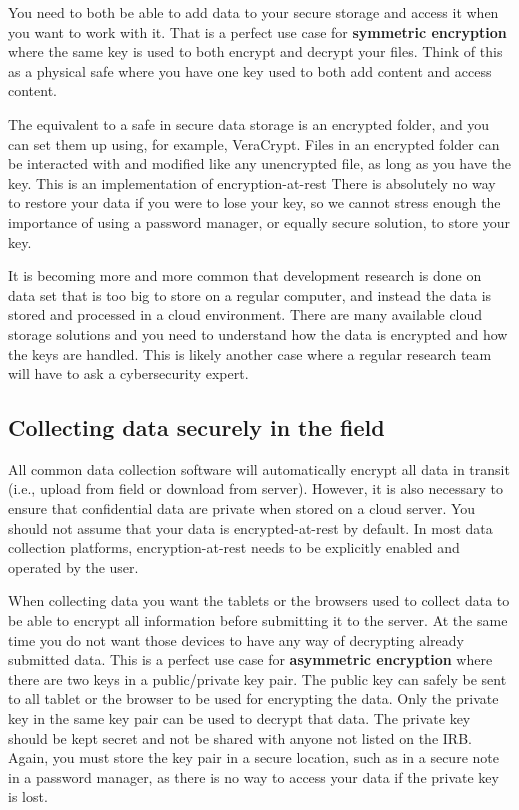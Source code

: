 You need to both be able to add data to your secure storage
and access it when you want to work with it.
That is a perfect use case for \textbf{symmetric encryption} 
where the same key is used to both encrypt and decrypt your files.
Think of this as a physical safe where you have one key 
used to both add content and access content.

The equivalent to a safe in secure data storage is an encrypted folder,
and you can set them up using, for example, VeraCrypt.
Files in an encrypted folder can be interacted with and modified like any unencrypted file,
as long as you have the key.
This is an implementation of encryption-at-rest
There is absolutely no way to restore your data if you were to lose your key, 
so we cannot stress enough the importance of using a password manager,
or equally secure solution, to store your key.

It is becoming more and more common that development research
is done on data set that is too big to store on a regular computer,
and instead the data is stored and processed in a cloud environment. 
There are many available cloud storage solutions
and you need to understand how the data is encrypted and how the keys are handled.
This is likely another case where a regular research team will have to ask a cybersecurity expert.

\subsection{Collecting data securely in the field}

All common data collection software will automatically encrypt
all data in transit (i.e., upload from field or download from server).
However, it is also necessary to ensure that confidential data 
are private when stored on a cloud server.
You should not assume that your data is encrypted-at-rest by default.
In most data collection platforms,
encryption-at-rest needs to be explicitly enabled and operated by the user.

When collecting data you want the tablets or the browsers used to collect data
to be able to encrypt all information before submitting it to the server. 
At the same time you do not want those devices to have any way of decrypting already submitted data.
This is a perfect use case for \textbf{asymmetric encryption}
where there are two keys in a public/private key pair.
The public key can safely be sent to all tablet or the browser to be used for encrypting the data.
Only the private key in the same key pair can be used to decrypt that data.
The private key should be kept secret and not be shared with anyone not listed on the IRB.
Again, you must store the key pair in a secure location, 
such as in a secure note in a password manager,
as there is no way to access your data if the private key is lost.

